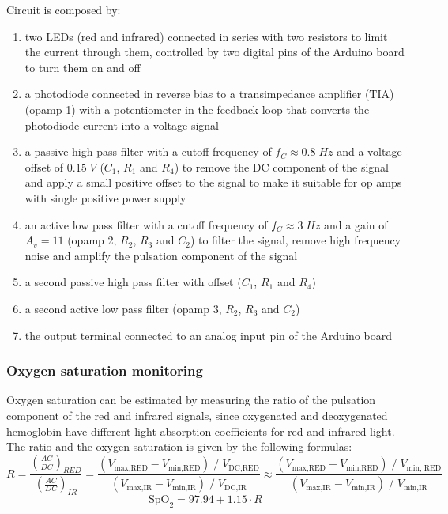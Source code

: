 \noindent
Circuit is composed by:
\begin{enumerate}
	\item two LEDs (red and infrared) connected in series with two resistors to limit the current through them, controlled by two digital
	pins of the Arduino board to turn them on and off
	\item a photodiode connected in reverse bias to a transimpedance amplifier (TIA) (opamp 1) with a potentiometer in the feedback loop
	that converts the photodiode current into a voltage signal
	\item a passive high pass filter with a cutoff frequency of \(f_C \approx 0.8 \; Hz\) and a voltage offset of \(0.15 \; V\) (\(C_1\),
	\(R_1\) and \(R_4\)) to remove the DC component of the signal and apply a small positive offset to the signal to make it suitable
	for op amps with single positive power supply
	\item an active low pass filter with a cutoff frequency of \(f_C \approx 3 \; Hz\) and a gain of \(A_v = 11\) (opamp 2, \(R_2\), \(R_3\)
	and \(C_2\)) to filter the signal, remove high frequency noise and amplify the pulsation component of the signal
	\item a second passive high pass filter with offset (\(C_1\), \(R_1\) and \(R_4\))
	\item a second active low pass filter (opamp 3, \(R_2\), \(R_3\) and \(C_2\))
	\item the output terminal connected to an analog input pin of the Arduino board
\end{enumerate}

\subsubsection*{Oxygen saturation monitoring}
Oxygen saturation can be estimated by measuring the ratio of the pulsation component of the red and infrared signals, since oxygenated
and deoxygenated hemoglobin have different light absorption coefficients for red and infrared light. The ratio and the oxygen saturation
is given by the following formulas:
\[R = \frac{\displaystyle \left(\frac{AC}{DC}\right)_{RED}}{\displaystyle \left(\frac{AC}{DC}\right)_{IR}} = \frac{(V_{\text{max,RED}} - V_{\text{min,RED}}) \; / \; V_{\text{DC,RED}}}{(V_{\text{max,IR}} - V_{\text{min,IR}}) \; / \; V_{\text{DC,IR}}} \approx \frac{(V_{\text{max,RED}} - V_{\text{min,RED}}) \; / \; V_{\text{min, RED}}}{(V_{\text{max,IR}} - V_{\text{min,IR}}) \; / \; V_{\text{min,IR}}}\]
\[\text{SpO}_2 = 97.94 + 1.15 \cdot R\]
